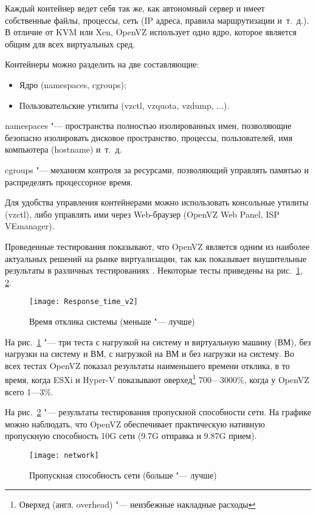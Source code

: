 Каждый контейнер ведет себя так же, как автономный сервер и имеет собственные файлы, процессы, сеть (IP адреса, правила маршрутизации и~т.~д.).
В отличие от KVM или Xen, OpenVZ использует одно ядро, которое является общим для всех виртуальных сред.

Контейнеры можно разделить на две составляющие:
\begin{itemize}
    \item Ядро (namespaces, cgroups);
    \item Пользовательские утилиты (vzctl, vzquota, vzdump, ...).
\end{itemize}
 
namespaces "--- пространства полностью изолированных имен, позволяющие безопасно изолировать дисковое пространство, процессы, пользователей, имя компьютера (hostname) и~т.~д.

cgroups "--- механизм контроля за ресурсами, позволяющий управлять памятью и распределять процессорное время.

Для удобства управления контейнерами можно использовать консольные утилиты (vzctl), либо управлять ими через Web-браузер (OpenVZ Web Panel, ISP VEmanager).

Проведенные тестирования показывают, что OpenVZ является одним из наиболее актуальных решений на рынке виртуализации, так как показывает внушительные результаты в различных тестированиях \cite{padala2007performance}.
Некоторые тесты \cite{openvzperformance} приведены на рис.~\ref{pic:openvz_test_1}, \ref{pic:openvz_test_2}.

\begin{figure}[ht]
    \centering
	\texttt{[image: Response\_time\_v2]}
	\caption{Время отклика системы (меньше "--- лучше)}\label{pic:openvz_test_1}
\end{figure}

На рис.~\ref{pic:openvz_test_1} "--- три теста с нагрузкой на систему и виртуальную машину (ВМ), без нагрузки на систему и ВМ, с нагрузкой на ВМ и без нагрузки на систему.
Во всех тестах OpenVZ показал результаты наименьшего времени отклика, в то время, когда ESXi и Hyper-V показывают оверхед\footnote{Оверхед (англ. overhead) "--- неизбежные накладные расходы} 700---3000\%, когда у OpenVZ всего 1---3\%.

На рис.~\ref{pic:openvz_test_2} "--- результаты тестирования пропускной способности сети.
На графике можно наблюдать, что OpenVZ обеспечивает практическую нативную пропускную способность 10G сети (9.7G отправка и 9.87G прием).
\begin{figure}[ht]
    \centering
	\texttt{[image: network]}
	\caption{Пропускная способность сети (больше "--- лучше)}\label{pic:openvz_test_2}
\end{figure}

\clearpage
